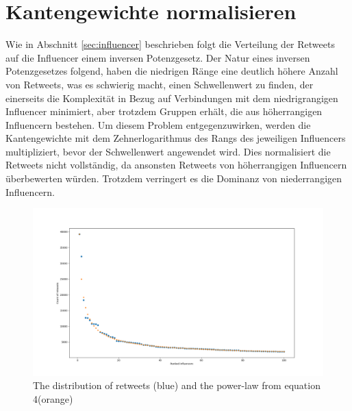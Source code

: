 \section{Kantengewichte normalisieren}
Wie in Abschnitt \ref{sec:influencer} beschrieben folgt die Verteilung der Retweets auf die Influencer einem inversen Potenzgesetz.
Der Natur eines inversen Potenzgesetzes folgend, haben die niedrigen Ränge eine deutlich höhere Anzahl von Retweets, was es schwierig macht, einen Schwellenwert zu finden, der einerseits die Komplexität in Bezug auf Verbindungen mit dem niedrigrangigen Influencer minimiert, aber trotzdem Gruppen erhält, die aus höherrangigen Influencern bestehen.
Um diesem Problem entgegenzuwirken, werden die Kantengewichte mit dem Zehnerlogarithmus des Rangs des jeweiligen Influencers multipliziert, bevor der Schwellenwert angewendet wird.
Dies normalisiert die Retweets nicht vollständig, da ansonsten \glspl{Retweet} von höherrangigen Influencern überbewerten würden.
Trotzdem verringert es die Dominanz von niederrangigen Influencern.
\begin{figure}[h!]
	\centering
	\includegraphics[width=\linewidth]{images/power-law}
	\caption{The distribution of retweets (blue) and the power-law from equation 4(orange)}
	\label{fig:power-law}
\end{figure}
\pagebreak
